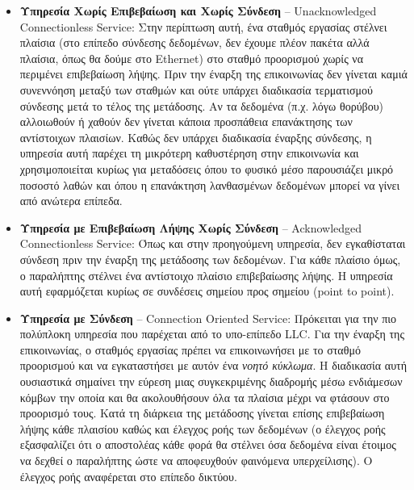 \begin{itemize}
\item \textbf{Υπηρεσία Χωρίς Επιβεβαίωση και Χωρίς Σύνδεση} -- Unacknowledged \\ Connectionless Service: Στην περίπτωση αυτή, ένα σταθμός εργασίας στέλνει πλαίσια (στο επίπεδο σύνδεσης δεδομένων, δεν έχουμε πλέον πακέτα αλλά πλαίσια, όπως θα δούμε στο Ethernet) στο σταθμό προορισμού χωρίς να περιμένει επιβεβαίωση λήψης. Πριν την έναρξη της επικοινωνίας δεν γίνεται καμιά συνεννόηση μεταξύ των σταθμών και ούτε υπάρχει διαδικασία τερματισμού σύνδεσης μετά το τέλος της μετάδοσης. Αν τα δεδομένα (π.χ. λόγω θορύβου) αλλοιωθούν ή χαθούν δεν γίνεται κάποια προσπάθεια επανάκτησης των αντίστοιχων πλαισίων. Καθώς δεν υπάρχει διαδικασία έναρξης σύνδεσης, η υπηρεσία αυτή παρέχει τη μικρότερη καθυστέρηση στην επικοινωνία και χρησιμοποιείται κυρίως για μεταδόσεις όπου το φυσικό μέσο παρουσιάζει μικρό ποσοστό λαθών και όπου η επανάκτηση λανθασμένων δεδομένων μπορεί να γίνει από ανώτερα επίπεδα.
\item \textbf{Υπηρεσία με Επιβεβαίωση Λήψης Χωρίς Σύνδεση} -- Acknowledged \\ Connectionless Service: Όπως και στην προηγούμενη υπηρεσία, δεν εγκαθίσταται σύνδεση πριν την έναρξη της μετάδοσης των δεδομένων. Για κάθε πλαίσιο όμως, ο παραλήπτης στέλνει ένα αντίστοιχο πλαίσιο επιβεβαίωσης λήψης. Η υπηρεσία αυτή εφαρμόζεται κυρίως σε συνδέσεις σημείου προς σημείου (point to point).
\item \textbf{Υπηρεσία με Σύνδεση} -- Connection Oriented Service: Πρόκειται για την πιο πολύπλοκη υπηρεσία που παρέχεται από το υπο-επίπεδο LLC. Για την έναρξη της επικοινωνίας, ο σταθμός εργασίας πρέπει να επικοινωνήσει με το σταθμό προορισμού και να εγκαταστήσει με αυτόν ένα \emph{νοητό κύκλωμα}. Η διαδικασία αυτή ουσιαστικά σημαίνει την εύρεση μιας συγκεκριμένης διαδρομής μέσω ενδιάμεσων κόμβων την οποία και θα ακολουθήσουν όλα τα πλαίσια μέχρι να φτάσουν στο προορισμό τους. Κατά τη διάρκεια της μετάδοσης γίνεται επίσης επιβεβαίωση λήψης κάθε πλαισίου καθώς και έλεγχος ροής των δεδομένων (ο έλεγχος ροής εξασφαλίζει ότι ο αποστολέας κάθε φορά θα στέλνει όσα δεδομένα είναι έτοιμος να δεχθεί ο παραλήπτης ώστε να αποφευχθούν φαινόμενα υπερχείλισης). Ο έλεγχος ροής αναφέρεται στο επίπεδο δικτύου.


\end{itemize}
